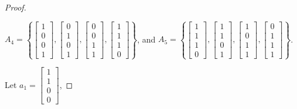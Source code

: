 \documentclass[10pt,a4paper]{amsart}
\begin{document}
\begin{proof}
\begin{center}
    	$A_4 = \left\{\begin{bmatrix}
    		1 \\
    		0 \\
    		0 \\
    		1
    	\end{bmatrix},
    	\begin{bmatrix}
    		0 \\
    		1 \\
    		0 \\
    		1
    	\end{bmatrix},
    	\begin{bmatrix}
    		0 \\
    		0 \\
    		1 \\
    		1
    	\end{bmatrix},
    	\begin{bmatrix}
    		1 \\
    		1 \\
    		1 \\
    		0
    	\end{bmatrix}\right\}$, and 
    	$A_5 = \left\{\begin{bmatrix}
    		1 \\
    		1 \\
    		1 \\
    		0
    	\end{bmatrix},
    	\begin{bmatrix}
    		1 \\
    		1 \\
    		0 \\
    		1
    	\end{bmatrix},
    	\begin{bmatrix}
    		1 \\
    		0 \\
    		1 \\
    		1
    	\end{bmatrix},
    	\begin{bmatrix}
    		0 \\
    		1 \\
    		1 \\
    		1
    	\end{bmatrix}\right\}$.
    \end{center}
    Let $a_1 = \begin{bmatrix}
    	1 \\
    	1 \\
    	0 \\
    	0
    \end{bmatrix}$, 

\end{proof}
\end{document}
